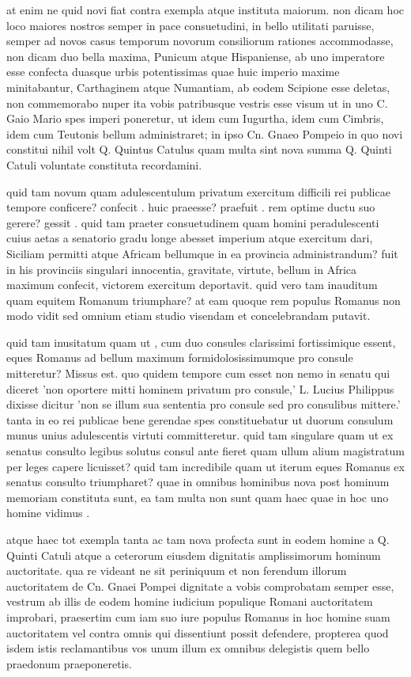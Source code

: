  at enim ne quid novi fiat contra exempla atque instituta maiorum. non dicam hoc loco maiores nostros semper in pace consuetudini, in bello utilitati paruisse, semper ad novos casus temporum novorum consiliorum rationes accommodasse, non dicam duo bella maxima, Punicum atque Hispaniense, ab uno imperatore esse confecta duasque urbis potentissimas quae huic imperio maxime minitabantur, Carthaginem atque Numantiam, ab eodem Scipione esse deletas, non commemorabo nuper ita vobis patribusque vestris esse visum ut in uno C. Gaio Mario spes imperi poneretur, ut idem cum Iugurtha, idem cum Cimbris, idem cum Teutonis bellum administraret; in ipso Cn. Gnaeo Pompeio in quo novi constitui nihil volt Q. Quintus Catulus quam multa sint nova summa Q. Quinti Catuli voluntate constituta recordamini.

 quid tam novum quam adulescentulum privatum exercitum difficili rei publicae tempore conficere? confecit . huic praeesse? praefuit . rem optime ductu suo gerere? gessit . quid tam praeter consuetudinem quam homini peradulescenti cuius aetas a senatorio gradu longe abesset imperium atque exercitum dari, Siciliam permitti atque Africam bellumque in ea provincia administrandum? fuit in his provinciis singulari innocentia, gravitate, virtute, bellum in Africa maximum confecit, victorem exercitum deportavit. quid vero tam inauditum quam equitem Romanum triumphare? at eam quoque rem populus Romanus non modo vidit sed omnium etiam studio visendam et concelebrandam putavit.

 quid tam inusitatum quam ut , cum duo consules clarissimi fortissimique essent, eques Romanus ad bellum maximum formidolosissimumque pro consule mitteretur? Missus est. quo quidem tempore cum esset non nemo in senatu qui diceret 'non oportere mitti hominem privatum pro consule,' L. Lucius Philippus dixisse dicitur 'non se illum sua sententia pro consule sed pro consulibus mittere.' tanta in eo rei publicae bene gerendae spes constituebatur ut duorum consulum munus unius adulescentis virtuti committeretur. quid tam singulare quam ut ex senatus consulto legibus solutus consul ante fieret quam ullum alium magistratum per leges capere licuisset? quid tam incredibile quam ut iterum eques Romanus ex senatus consulto triumpharet? quae in omnibus hominibus nova post hominum memoriam constituta sunt, ea tam multa non sunt quam haec quae in hoc uno homine vidimus .

 atque haec tot exempla tanta ac tam nova profecta sunt in eodem homine a Q. Quinti Catuli atque a ceterorum eiusdem dignitatis amplissimorum hominum auctoritate. qua re videant ne sit periniquum et non ferendum illorum auctoritatem de Cn. Gnaei Pompei dignitate a vobis comprobatam semper esse, vestrum ab illis de eodem homine iudicium populique Romani auctoritatem improbari, praesertim cum iam suo iure populus Romanus in hoc homine suam auctoritatem vel contra omnis qui dissentiunt possit defendere, propterea quod isdem istis reclamantibus vos unum illum ex omnibus delegistis quem bello praedonum praeponeretis.

